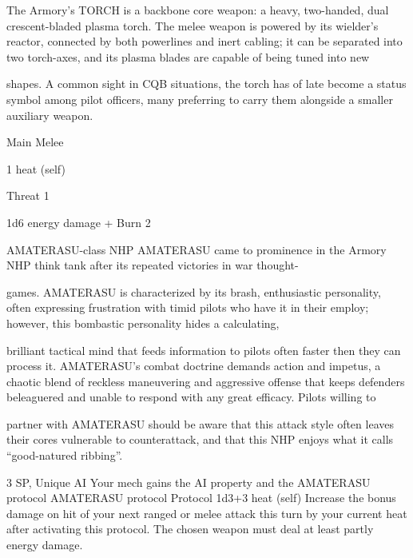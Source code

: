 The Armory’s TORCH is a backbone core weapon: a heavy, two-handed, dual crescent-bladed plasma
torch. The melee weapon is powered by its wielder’s reactor, connected by both powerlines and inert
cabling; it can be separated into two torch-axes, and its plasma blades are capable of being tuned into new

shapes. A common sight in CQB situations, the torch has of late become a status symbol among pilot
officers, many preferring to carry them alongside a smaller auxiliary weapon.

Main Melee

1 heat (self)

Threat 1

1d6 energy damage + Burn 2


AMATERASU-class NHP
AMATERASU came to prominence in the Armory NHP think tank after its repeated victories in war thought-

games. AMATERASU is characterized by its brash, enthusiastic personality, often expressing frustration
with timid pilots who have it in their employ; however, this bombastic personality hides a calculating,

brilliant tactical mind that feeds information to pilots often faster then they can process it. AMATERASU’s
combat doctrine demands action and impetus, a chaotic blend of reckless maneuvering and aggressive
offense that keeps defenders beleaguered and unable to respond with any great efficacy. Pilots willing to

partner with AMATERASU should be aware that this attack style often leaves their cores vulnerable to
counterattack, and that this NHP enjoys what it calls ``good-natured ribbing''.

3 SP, Unique
AI
Your mech gains the AI property and the AMATERASU protocol
	        AMATERASU protocol
	        Protocol
	        1d3+3 heat (self)
         Increase the bonus damage on hit of your next ranged or melee attack this turn by your
         current heat after activating this protocol. The chosen weapon must deal at least partly
         energy damage.
